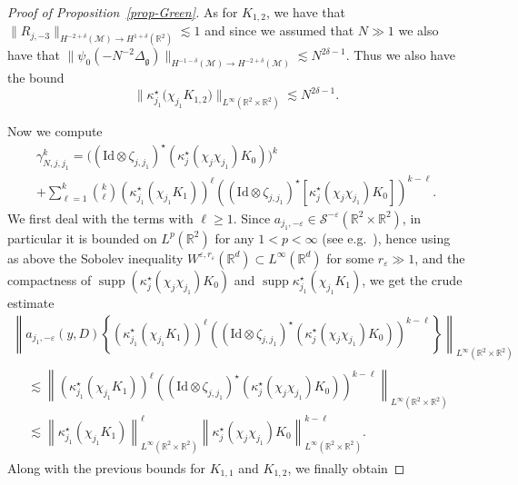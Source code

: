 \documentclass[AHL,Unicode,longabstracts,published]{cedram}
\newcommand{\R}{\mathbb{R}}
\DeclareMathOperator*{\supp}{supp}
\renewcommand{\S}{\mathcal{S}}
\newcommand{\M}{\mathcal{M}}
\newcommand{\Id}{\mathrm{Id}}
\newcommand{\g}{\mathfrak{g}}
\newcommand{\dl}{\delta}
\newcommand{\Dlg}{\Delta_{\g}}
\newcommand{\eps}{\varepsilon}
\newcommand{\kk}{\kappa}
\newcommand{\les}{\lesssim}
\begin{document}
\begin{proof}[Proof of Proposition~\ref{prop-Green}]
As for $K_{1,2}$, we have that $\|R_{j,-3}\|_{H^{-2+\dl}(\M)\to H^{1+\dl}(\R^2)}\les 1$ and since we assumed that $N\gg 1$ we also have that $\|\psi_0(-N^{-2}\Dlg)\|_{H^{-1-\dl}(\M)\to H^{-2+\dl}(\M)}\les N^{2\dl-1}$. Thus we also have the bound
\begin{equation*}
\big\|\kk_{j_1}^{\star}\big(\chi_{j_1}K_{1,2}\big)\big\|_{L^{\infty}(\R^2\times\R^2)}\les N^{2\dl-1}.
\end{equation*}

Now we compute
\begin{multline*}
\gamma_{N,j,j_1}^k = \Big(\left(\Id\otimes\zeta_{j,j_1}\right)^{\star}\left(\kk_j^{\star}\left(\chi_j\chi_{j_1}\right)K_0\right)\Big)^k\\
+\sum_{\ell=1}^k{\binom k \ell}\left(\kk_{j_1}^{\star}\left(\chi_{j_1}K_1\right)\right)^{\ell}\left(\left(\Id\otimes\zeta_{j,j_1}\right)^{\star}\left[\kk_j^\star\left(\chi_j\chi_{j_1}\right)K_0\right]\right)^{k-\ell}.
\end{multline*}
We first deal with the terms with $\ell \ge 1$. Since $a_{j_1,-\eps}\in\S^{-\eps}(\R^2\times\R^2)$, in particular it is bounded on $L^p(\R^2)$ for any $1<p<\infty$ (see e.g.~\cite{F}), hence using as above the Sobolev inequality $W^{\eps,r_{\eps}}(\R^d)\subset L^\infty(\R^d)$ for some $r_\eps\gg1$, and the compactness of $\supp (\kk_j^{\star}(\chi_j\chi_{j_1})K_0)$ and $\supp \kk_{j_1}^{\star}(\chi_{j_1}K_1)$, we get the crude estimate
\begin{multline*}
\left\| a_{j_1,-\eps}(y,D)\left\{\left(\kk_{j_1}^{\star}\left(\chi_{j_1}K_1\right)\right)^{\ell}\left(\left(\Id\otimes\zeta_{j,j_1}\right)^{\star}\left(\kk_j^{\star}\left(\chi_j\chi_{j_1}\right)K_0\right)\right)^{k-\ell}\right\}\right\|_{L^{\infty}\left(\R^2\times\R^2\right)}\\
\begin{aligned}
&\les \left\|\left(\kk_{j_1}^{\star}\left(\chi_{j_1}K_1\right)\right)^{\ell}\left(\left(\Id\otimes\zeta_{j,j_1}\right)^{\star}\left(\kk_j^{\star}\left(\chi_j\chi_{j_1}\right)K_0\right)\right)^{k-\ell}\right\|_{L^{\infty}\left(\R^2\times\R^2\right)}\\
&\les \left\|\kk_{j_1}^{\star}\left(\chi_{j_1}K_1\right)\right\|_{L^{\infty}\left(\R^2\times\R^2\right)}^{\ell}\left\|\kk_j^{\star}\left(\chi_j\chi_{j_1}\right)K_0\right\|_{L^{\infty}\left(\R^2\times\R^2\right)}^{k-\ell}.
\end{aligned}
\end{multline*}
Along with the previous bounds for $K_{1,1}$ and $K_{1,2}$, we finally obtain

\end{proof}
\end{document}
